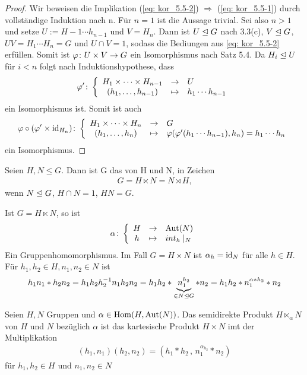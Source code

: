 \begin{proof}
	Wir beweisen die Implikation (\ref{eq: kor_5.5-2}) $\Rightarrow$ (\ref{eq: kor_5.5-1}) durch vollständige Induktion nach n.
	Für $n=1$ ist die Aussage trivial. Sei also $n > 1$ und setze $U := H-1 \cdots h_{n-1}$ und $V = H_n$. Dann ist $U \trianglelefteq G$ nach  3.3(c), $V \trianglelefteq G$, $UV = H_1 \cdots H_n = G$ und $U \cap V = 1$, sodass die Bediungen aus \cref{eq: kor_5.5-2} erfüllen. Somit ist $\varphi \colon U \times V \to G$ ein Isomorphismus nach Satz 5.4. Da $H_i \trianglelefteq U$ für $i < n$ folgt nach Induktionshypothese, dass 
	\begin{align*}
		\varphi' \colon \left\lbrace \begin{array}{ccl} H_1 \times \cdots \times H_{n-1} & \to & U \\(h_1, \dots, h_{n-1}) & \mapsto & h_1 \cdots h_{n-1} \end{array} \right.
	\end{align*}
	ein Isomorphismus ist. Somit ist auch
	\begin{align*}
		\varphi \circ (\varphi'  \times \operatorname{id}_{H_n}) \colon \left\lbrace \begin{array}{ccl} H_1 \times \cdots \times H_n & \to & G \\(h_1, \dots, h_n) & \mapsto & \varphi( \varphi'(h_1 \cdots h_{n-1}), h_n) = h_1 \cdots h_n \end{array} \right.
	\end{align*}
	ein Isomorphismus.
\end{proof}
%
\begin{defin}
	Seien $H,N \leq G$. Dann ist G das  von H und N, in Zeichen 
	\begin{align*}
		G = H \ltimes N = N \rtimes H \text{,}
	\end{align*}
wenn $N \trianglelefteq G$, $H \cap N = 1$, $HN = G$.
\end{defin}
%
\begin{bem}
	Ist $G = H \ltimes N$, so ist
	\begin{align*}
		\alpha \colon \left\lbrace \begin{array}{ccl} H & \to & \operatorname{Aut}(N) \\h & \mapsto & int_h \mid_N \end{array} \right.
	\end{align*}
	Ein Gruppenhomomorphismus. Im Fall $G = H \times N$ ist $\alpha_h = \operatorname{id}_N$ für alle $h \in H$. Für $h_1, h_2 \in H, n_1, n_2 \in N$ ist 
	\begin{align*}
		h_1 n_1 * h_2 n_2 = h_1 h_2 h_2^{-1} n_1 h_2 n_2 = h_1 h_2 * \underbrace{n_1^{h_2}}_{\in N \trianglelefteq G} * n_2 = h_1 h_2 * n_1^{\alpha * h_2} * n_2
	\end{align*}
\end{bem}
%
\begin{defin}
	Seien $H,N$ Gruppen und $\alpha \in \operatorname{Hom}(H, \operatorname{Aut}(N))$. Das semidirekte Produkt $H \ltimes_{\alpha} N$ von $H$ und $N$ bezüglich $\alpha$ ist das kartesische Produkt $H \times N$ imt der Multiplikation
	\begin{align*}
		(h_1, n_1)(h_2,n_2) = (h_1 * h_2 \, , \, n_1^{\alpha_{h_2}} * n_2)
	\end{align*}
	für $h_1, h_2 \in H$ und $n_1, n_2 \in N$
\end{defin}